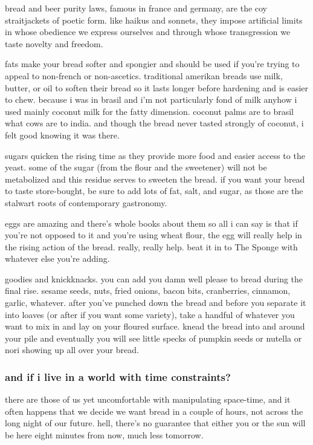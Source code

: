 bread and beer purity laws, famous in france and germany, are the coy
straitjackets of poetic form. like haikus and sonnets, they impose
artificial limits in whose obedience we express ourselves and through
whose transgression we taste novelty and freedom.

fats make your bread softer and spongier and should be used if
you're trying to appeal to non-french or non-ascetics. traditional
amerikan breads use milk, butter, or oil to soften their bread so it
lasts longer before hardening and is easier to chew. because i was in
brasil and i'm not particularly fond of milk anyhow i used mainly
coconut milk for the fatty dimension. coconut palms are to brasil what
cows are to india. and though the bread never tasted strongly of
coconut, i felt good knowing it was there.

sugars quicken the rising time as they provide more food and easier
access to the yeast. some of the sugar (from the flour and the
sweetener) will not be metabolized and this residue serves to sweeten
the bread. if you want your bread to taste store-bought, be sure to
add lots of fat, salt, and sugar, as those are the stalwart roots of
contemporary gastronomy.

eggs are amazing and there's whole books about them so all i can
say is that if you're not opposed to it and you're using wheat
flour, the egg will really help in the rising action of the
bread. really, really help. beat it in to The Sponge with whatever
else you're adding.

goodies and knickknacks. you can add  you damn well please to
bread during the final rise. sesame seeds, nuts, fried onions, bacon
bits, cranberries, cinnamon, garlic, whatever. after you've punched
down the bread and before you separate it into loaves (or after if you
want some variety), take a handful of whatever you want to mix in and
lay on your floured surface. knead the bread into and around your pile
and eventually you will see little specks of pumpkin seeds or nutella
or nori showing up all over your bread.

\subsubsection{and if i live in a world with time constraints?}

there are those of us yet uncomfortable with manipulating space-time,
and it often happens that we decide we want bread in a couple of
hours, not across the long night of our future. hell, there's no
guarantee that either you or the sun will be here eight minutes from
now, much less tomorrow.

